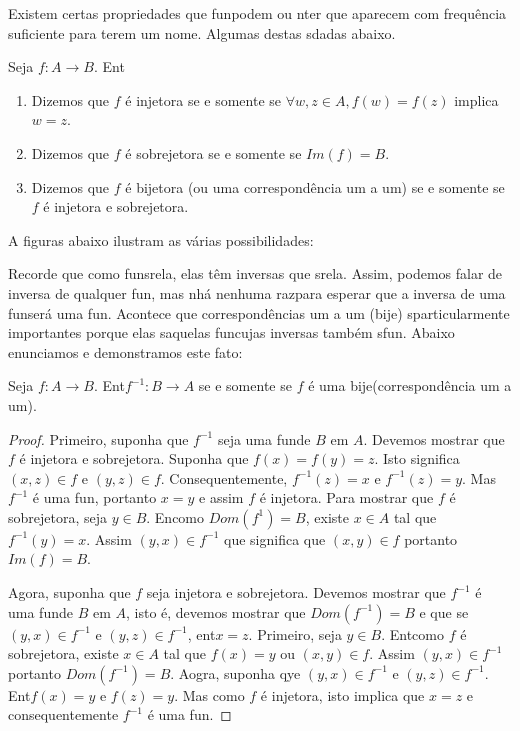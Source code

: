 Existem certas propriedades que fun\coes podem ou n\ao ter que aparecem com frequ\^encia suficiente para terem um nome. Algumas destas s\ao dadas abaixo.
\begin{definb}
Seja $f:A\to B$. Ent\ao
\begin{enumerate}[{\bf a)}]
\item Dizemos que $f$ \'e injetora se e somente se $\forall w,z\in A, f(w)=f(z)$ implica $w=z$. 
\item Dizemos que $f$ \'e sobrejetora se e somente se $Im(f)=B$.
\item Dizemos que $f$ \'e bijetora (ou uma correspond\^encia um a um) se e somente se $f$ \'e injetora e sobrejetora.
\end{enumerate}
\end{definb}
A figuras abaixo ilustram as v\'arias possibilidades:

%
%
%
%
%
%
%
%
%
%

Recorde que como fun\coes s\ao rela\cois, elas t\^em inversas que s\ao rela\cois. Assim, podemos falar de inversa de qualquer fun\caoi, mas n\ao h\'a nenhuma raz\ao para esperar que a inversa de uma fun\cao ser\'a uma fun\caoi. Acontece que correspond\^encias um a um (bije\cois) s\ao particularmente importantes porque elas s\ao aquelas fun\coes cujas inversas tamb\'em s\ao fun\cois. Abaixo enunciamos e demonstramos este fato:
\begin{teob}\label{functeo13}
Seja $f:A\to B$. Ent\ao $f^{-1}:B\to A$ se e somente se $f$ \'e uma bije\cao (correspond\^encia um a um).
\end{teob}
\begin{proof}
Primeiro, suponha que $f^{-1}$ seja uma fun\cao de $B$ em $A$. Devemos mostrar que $f$ \'e injetora e sobrejetora. Suponha que $f(x)=f(y)=z$. Isto significa $(x,z)\in f$ e $(y,z)\in f$. Consequentemente, $f^{-1}(z)=x$ e $f^{-1}(z)=y$. Mas $f^{-1}$ \'e uma fun\caoi, portanto $x=y$ e assim $f$ \'e injetora. Para mostrar que $f$ \'e sobrejetora, seja $y\in B$. En\tao como $Dom(f^{1})=B$, existe $x\in A$ tal que $f^{-1}(y)=x$. Assim $(y,x)\in f^{-1}$ que significa que $(x,y)\in f$ portanto $Im(f)=B$.

Agora, suponha que $f$ seja injetora e sobrejetora. Devemos mostrar que $f^{-1}$ \'e uma fun\cao de $B$ em $A$, isto \'e, devemos mostrar que $Dom(f^{-1})=B$ e que se $(y,x)\in f^{-1}$ e $(y,z)\in f^{-1}$, ent\ao $x=z$. Primeiro, seja $y\in B$. Ent\ao como $f$ \'e sobrejetora, existe $x\in A$ tal que $f(x)=y$ ou $(x,y)\in f$. Assim $(y,x)\in f^{-1}$ portanto $Dom(f^{-1})=B$. Aogra, suponha qye $(y,x)\in f^{-1}$ e $(y,z)\in f^{-1}$. Ent\ao $f(x)=y$ e $f(z)=y$. Mas como $f$ \'e injetora, isto implica que $x=z$ e consequentemente $f^{-1}$ \'e uma fun\caoi. 
\end{proof}
\\

